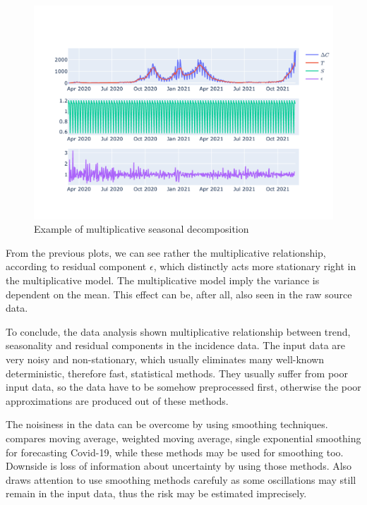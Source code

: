 \documentclass[
  digital, %
  table,   %
  twoside, %
  12pt,
  lof,     %
  lot,     %
]{fithesis3}
\begin{document}
\begin{figure}[h]
  \begin{center}
    \includegraphics[width=\textwidth]{images/seasonal-decomposition-multiplicative.png}
  \end{center}
  \caption{Example of multiplicative seasonal decomposition}
  \label{fig:seasonal-decomposition-multiplicative}
\end{figure}

From the previous plots, we can see rather the multiplicative 
relationship, according to residual component $\epsilon$, 
which distinctly acts more stationary right in the 
multiplicative model. 
The multiplicative model imply the variance is dependent 
on the mean. This effect can be, after all, also seen 
in the raw source data.

To conclude, the data analysis shown multiplicative 
relationship between trend, seasonality and residual 
components in the incidence data. 
The input data are very noisy and non-stationary, which 
usually eliminates many well-known deterministic, therefore 
fast, statistical methods. 
They usually suffer from poor input data, so the data have 
to be somehow preprocessed first, otherwise the poor 
approximations are produced out of these methods.

The noisiness in the data can be overcome by using 
smoothing techniques.
\cite{elmousalami2020} compares moving average, weighted 
moving average, single exponential smoothing for 
forecasting Covid-19, while these methods may be used 
for smoothing too. 
Downside is loss of information about uncertainty by using 
those methods. 
Also \cite{annunziato2020} draws attention to use smoothing 
methods carefuly as some oscillations may still remain in 
the input data, thus the risk may be estimated imprecisely.
\end{document}

